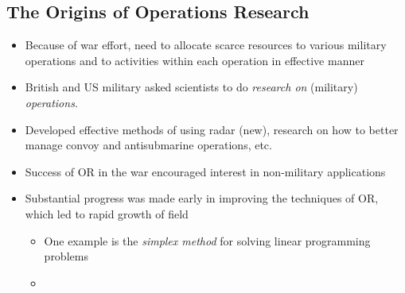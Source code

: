 \documentclass{article}
\begin{document}
\subsection{The Origins of Operations Research}
\begin{itemize}
\item Because of war effort, need to allocate scarce resources to various military operations and to activities within each operation in effective manner
\item British and US military asked scientists to do \textit{ research on } (military) \textit{ operations}.
\item Developed effective methods of using radar (new), research on how to better manage convoy and antisubmarine operations, etc.
\item Success of OR in the war encouraged interest in non-military applications
\item Substantial progress was made early in improving the techniques of OR, which led to rapid growth of field
	\begin{itemize}
	\item One example is the \textit{simplex method} for solving linear programming problems
    \item 
	\end{itemize}
\end{itemize}
\end{document}
